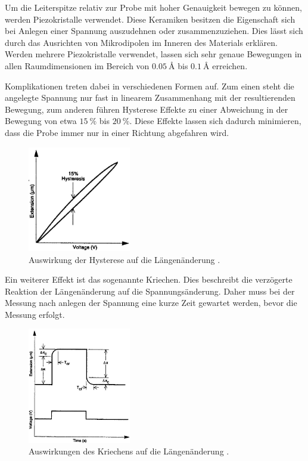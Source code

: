 Um die Leiterspitze relativ zur Probe mit hoher Genauigkeit bewegen zu können, werden Piezokristalle verwendet.
Diese Keramiken besitzen die Eigenschaft sich bei Anlegen einer Spannung auszudehnen oder zusammenzuziehen.
Dies lässt sich durch das Ausrichten von Mikrodipolen im Inneren des Materials erklären.
Werden mehrere Piezokristalle verwendet, lassen sich sehr genaue Bewegungen in allen Raumdimensionen im Bereich von  $\SI{0,05}{\angstrom}$ bis $\SI{0,1}{\angstrom}$ erreichen.

Komplikationen treten dabei in verschiedenen Formen auf.
Zum einen steht die angelegte Spannung nur fast in linearem Zusammenhang mit der resultierenden Bewegung, zum anderen führen Hysterese Effekte zu einer Abweichung in der Bewegung von etwa $\SI{15}{\percent}$ bis $\SI{20}{\percent}$.
Diese Effekte lassen sich dadurch minimieren, dass die Probe immer nur in einer Richtung abgefahren wird.
\begin{figure}[!h]
    \centering
    \includegraphics[width=0.4\textwidth]{images/hysterese.JPG}
    \caption{Auswirkung der Hysterese auf die Längenänderung \cite{STM-Literatur}.}
\end{figure}

Ein weiterer Effekt ist das sogenannte Kriechen.
Dies beschreibt die verzögerte Reaktion der Längenänderung auf die Spannungsänderung.
Daher muss bei der Messung nach anlegen der Spannung eine kurze Zeit gewartet werden, bevor die Messung erfolgt.
\begin{figure}[!h]
    \centering
    \includegraphics[width=0.4\textwidth]{images/kriechen.JPG}
    \caption{Auswirkungen des Kriechens auf die Längenänderung \cite{STM-Literatur}.}
\end{figure}

